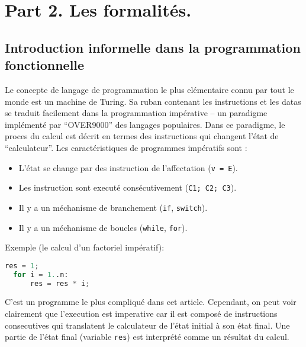 \documentclass[12pt, a4paper]{article}
\begin{document}
\newpage
\section*{Part 2. Les formalités.}

\subsection*{Introduction informelle dans la programmation fonctionnelle}
Le concepte de langage de programmation le plus elémentaire connu par tout le monde est un machine de Turing.
Sa ruban contenant les instructions et les datas se traduit facilement dans la programmation impérative -- un paradigme implémenté par ``OVER9000'' des langages populaires.
Dans ce paradigme, le proces du calcul est décrit en termes des instructions qui changent l'état de ``calculateur''.
Les caractéristiques de programmes impératifs sont :
\begin{itemize}
	\item L'état se change par des instruction de l'affectation (\verb|v = E|).
	\item Les instruction sont executé consécutivement (\verb|C1; C2; C3|).
	\item Il y a un méchanisme de branchement (\verb|if|, \verb|switch|).
	\item Il y a un méchanisme de boucles (\verb|while|, \verb|for|).
\end{itemize}
Exemple (le calcul d'un factoriel impératif):
\begin{lstlisting}[language=Python]
  res = 1;
  for i = 1..n:
      res = res * i;
\end{lstlisting}
C'est un programme le plus compliqué dans cet article.
Cependant, on peut voir clairement que l'execution est imperative car il est composé de instructions consecutives qui translatent le calculateur de l'état initial à son état final.
Une partie de l'état final (variable \verb|res|) est interprété comme un résultat du calcul.
\end{document}
